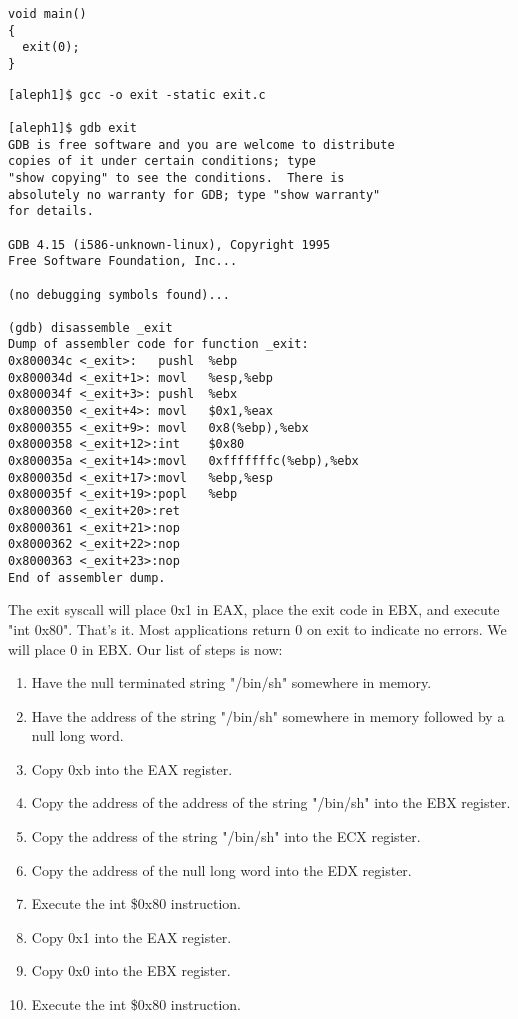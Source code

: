 \documentclass[10pt]{article}
\begin{document}
\begin{CJK}{UTF8}{bsmi}
\begin{lstlisting}[caption=exit.c]
void main() 
{
  exit(0);
}
\end{lstlisting}

{\small
\begin{verbatim}
[aleph1]$ gcc -o exit -static exit.c

[aleph1]$ gdb exit
GDB is free software and you are welcome to distribute 
copies of it under certain conditions; type 
"show copying" to see the conditions.  There is 
absolutely no warranty for GDB; type "show warranty" 
for details.

GDB 4.15 (i586-unknown-linux), Copyright 1995 
Free Software Foundation, Inc...

(no debugging symbols found)...

(gdb) disassemble _exit
Dump of assembler code for function _exit:
0x800034c <_exit>:   pushl  %ebp
0x800034d <_exit+1>: movl   %esp,%ebp
0x800034f <_exit+3>: pushl  %ebx
0x8000350 <_exit+4>: movl   $0x1,%eax
0x8000355 <_exit+9>: movl   0x8(%ebp),%ebx
0x8000358 <_exit+12>:int    $0x80
0x800035a <_exit+14>:movl   0xfffffffc(%ebp),%ebx
0x800035d <_exit+17>:movl   %ebp,%esp
0x800035f <_exit+19>:popl   %ebp
0x8000360 <_exit+20>:ret
0x8000361 <_exit+21>:nop
0x8000362 <_exit+22>:nop
0x8000363 <_exit+23>:nop
End of assembler dump.
\end{verbatim}
}
The exit syscall will place 0x1 in EAX, place the exit code in EBX, and execute "int 0x80". That's it. Most 
applications return 0 on exit to indicate no errors. We will place 0 in EBX.  Our list of steps is now: 

\begin{enumerate}
\item Have the null terminated string "/bin/sh" somewhere in memory. 
\item Have the address of the string "/bin/sh" somewhere in memory followed by a null long word. 
\item Copy 0xb into the EAX register. 
\item Copy the address of the address of the string "/bin/sh" into the EBX register. 
\item Copy the address of the string "/bin/sh" into the ECX register. 
\item Copy the address of the null long word into the EDX register. 
\item Execute the int \$0x80 instruction. 
\item Copy 0x1 into the EAX register. 
\item Copy 0x0 into the EBX register. 
\item Execute the int \$0x80 instruction. 
\end{enumerate}


\end{CJK}
\end{document}
